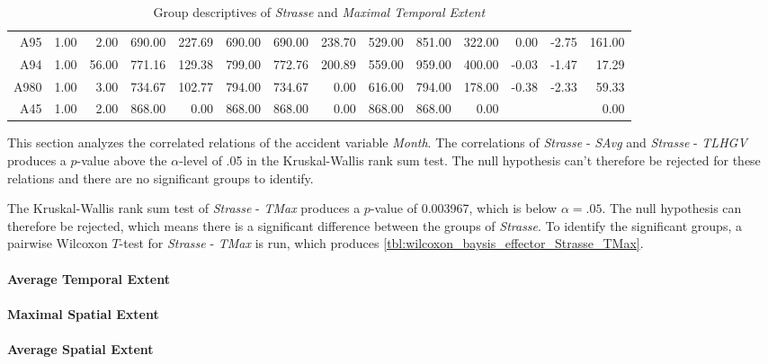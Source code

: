 \begin{table}[ht!]
\begin{tabular}{rrrrrrrrrrrrrr}
    A95  & 1.00 & 2.00 & 690.00 & 227.69 & 690.00 & 690.00 & 238.70 & 529.00 & 851.00 & 322.00 & 0.00 & -2.75 & 161.00 \\ 
    A94  & 1.00 & 56.00 & 771.16 & 129.38 & 799.00 & 772.76 & 200.89 & 559.00 & 959.00 & 400.00 & -0.03 & -1.47 & 17.29 \\ 
    A980 & 1.00 & 3.00 & 734.67 & 102.77 & 794.00 & 734.67 & 0.00 & 616.00 & 794.00 & 178.00 & -0.38 & -2.33 & 59.33 \\ 
    A45  & 1.00 & 2.00 & 868.00 & 0.00 & 868.00 & 868.00 & 0.00 & 868.00 & 868.00 & 0.00 &  &  & 0.00 \\ 
    \hline
  \end{tabular}
	\caption{Group descriptives of \textit{Strasse} and \textit{Maximal Temporal Extent}}
	\label{tbl:descriptives_baysis_matched_Strasse_TMax}
\end{table}

This section analyzes the correlated relations of the accident variable \textit{Month}. The correlations of \textit{Strasse} - \textit{SAvg} and \textit{Strasse} - \textit{TLHGV} produces a $p$-value above the $\alpha$-level of .05 in the Kruskal-Wallis rank sum test. The null hypothesis can't therefore be rejected for these relations and there are no significant groups to identify.

The Kruskal-Wallis rank sum test of \textit{Strasse} - \textit{TMax} produces a $p$-value of 0.003967, which is below $\alpha=.05$. The null hypothesis can therefore be rejected, which means there is a significant difference between the groups of \textit{Strasse}. To identify the significant groups, a pairwise Wilcoxon $T$-test for \textit{Strasse} - \textit{TMax} is run, which produces \cref{tbl:wilcoxon_baysis_effector_Strasse_TMax}. 


\paragraph{Average Temporal Extent}

\paragraph{Maximal Spatial Extent}

\paragraph{Average Spatial Extent}

